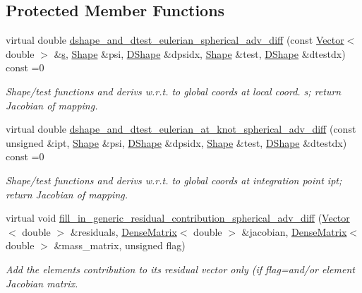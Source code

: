 \subsection*{Protected Member Functions}
\begin{DoxyCompactItemize}
\item 
virtual double \hyperlink{classoomph_1_1SphericalAdvectionDiffusionEquations_adad87bb3578d688543743e139aa1d84f}{dshape\+\_\+and\+\_\+dtest\+\_\+eulerian\+\_\+spherical\+\_\+adv\+\_\+diff} (const \hyperlink{classoomph_1_1Vector}{Vector}$<$ double $>$ \&\hyperlink{cfortran_8h_ab7123126e4885ef647dd9c6e3807a21c}{s}, \hyperlink{classoomph_1_1Shape}{Shape} \&psi, \hyperlink{classoomph_1_1DShape}{D\+Shape} \&dpsidx, \hyperlink{classoomph_1_1Shape}{Shape} \&test, \hyperlink{classoomph_1_1DShape}{D\+Shape} \&dtestdx) const =0
\begin{DoxyCompactList}\small\item\em Shape/test functions and derivs w.\+r.\+t. to global coords at local coord. s; return Jacobian of mapping. \end{DoxyCompactList}\item 
virtual double \hyperlink{classoomph_1_1SphericalAdvectionDiffusionEquations_a2b61d50b166871a64507ee13b8e94f54}{dshape\+\_\+and\+\_\+dtest\+\_\+eulerian\+\_\+at\+\_\+knot\+\_\+spherical\+\_\+adv\+\_\+diff} (const unsigned \&ipt, \hyperlink{classoomph_1_1Shape}{Shape} \&psi, \hyperlink{classoomph_1_1DShape}{D\+Shape} \&dpsidx, \hyperlink{classoomph_1_1Shape}{Shape} \&test, \hyperlink{classoomph_1_1DShape}{D\+Shape} \&dtestdx) const =0
\begin{DoxyCompactList}\small\item\em Shape/test functions and derivs w.\+r.\+t. to global coords at integration point ipt; return Jacobian of mapping. \end{DoxyCompactList}\item 
virtual void \hyperlink{classoomph_1_1SphericalAdvectionDiffusionEquations_ad97d019b2b4715d379adca3320262d29}{fill\+\_\+in\+\_\+generic\+\_\+residual\+\_\+contribution\+\_\+spherical\+\_\+adv\+\_\+diff} (\hyperlink{classoomph_1_1Vector}{Vector}$<$ double $>$ \&residuals, \hyperlink{classoomph_1_1DenseMatrix}{Dense\+Matrix}$<$ double $>$ \&jacobian, \hyperlink{classoomph_1_1DenseMatrix}{Dense\+Matrix}$<$ double $>$ \&mass\+\_\+matrix, unsigned flag)
\begin{DoxyCompactList}\small\item\em Add the element\textquotesingle{}s contribution to its residual vector only (if flag=and/or element Jacobian matrix. \end{DoxyCompactList}\end{DoxyCompactItemize}
